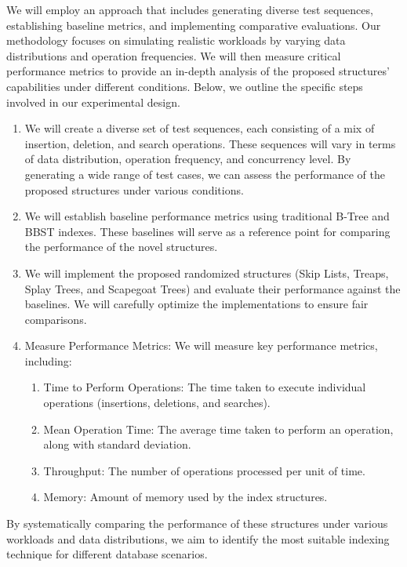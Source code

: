 \documentclass[sigconf]{acmart}
\begin{document}
We will employ an approach that includes generating diverse test sequences, establishing baseline metrics, and implementing comparative evaluations. Our methodology focuses on simulating realistic workloads by varying data distributions and operation frequencies. We will then measure critical performance metrics to provide an in-depth analysis of the proposed structures' capabilities under different conditions. Below, we outline the specific steps involved in our experimental design.

\begin{enumerate}
    \item We will create a diverse set of test sequences, each consisting of a mix of insertion, deletion, and search operations. These sequences will vary in terms of data distribution, operation frequency, and concurrency level. By generating a wide range of test cases, we can assess the performance of the proposed structures under various conditions.

    \item We will establish baseline performance metrics using traditional B-Tree and BBST indexes. These baselines will serve as a reference point for comparing the performance of the novel structures.

    \item  We will implement the proposed randomized structures (Skip Lists, Treaps, Splay Trees, and Scapegoat Trees) and evaluate their performance against the baselines. We will carefully optimize the implementations to ensure fair comparisons.

    \item Measure Performance Metrics: We will measure key performance metrics, including:
    \begin{enumerate}
        \item Time to Perform Operations: The time taken to execute individual operations (insertions, deletions, and searches).
        
        \item Mean Operation Time: The average time taken to perform an operation, along with standard deviation.

        \item Throughput: The number of operations processed per unit of time.

        \item Memory: Amount of memory used by the index structures.
    \end{enumerate}
\end{enumerate}
        

By systematically comparing the performance of these structures under various workloads and data distributions, we aim to identify the most suitable indexing technique for different database scenarios.

\clearpage



\end{document}
